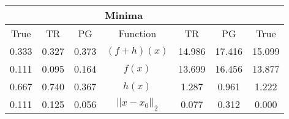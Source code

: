 \begin{tabular}{| c |c |c || c |c |c |c |}
    \hline
    \rowcolor[gray]{0.9}
\multicolumn{3}{|c|}{Parameters} & \multicolumn{4}{|c|}{Minima}\\ \hline True & TR & PG  & Function & TR & PG & True \\
    \hline
  \rowcolor[gray]{0.7}
  0.333 & 0.327 & 0.373   & $ (f + h)(x) $ & 14.986 & 17.416 & 15.099 \\
  \rowcolor[gray]{0.8}
  0.111 & 0.095 & 0.164   & $ f(x) $ & 13.699 & 16.456 & 13.877 \\
  \rowcolor[gray]{0.7}
  0.667 & 0.740 & 0.367   & $ h(x) $ & 1.287 & 0.961 & 1.222 \\
  \rowcolor[gray]{0.8}
  0.111 & 0.125 & 0.056   & $ ||x - x_0||_2 $ & 0.077 & 0.312 & 0.000 \\
\end{tabular}
